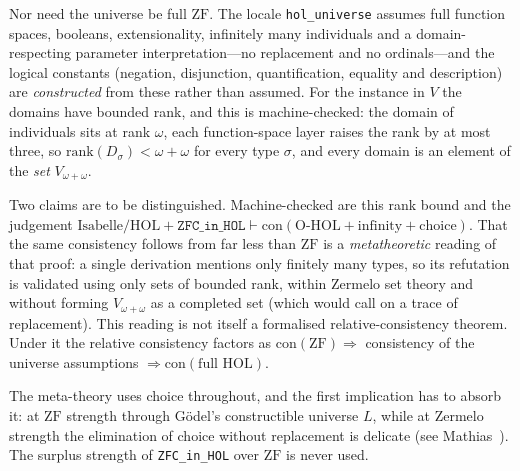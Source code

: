 \documentclass[11pt,a4paper]{article}
\begin{document}
Nor need the universe be full $\mathrm{ZF}$.  The locale
\texttt{hol\_universe} assumes full function spaces, booleans,
extensionality, infinitely many individuals and a domain-respecting
parameter interpretation---no replacement and no ordinals---and the
logical constants (negation, disjunction, quantification, equality and
description) are \emph{constructed} from these rather than assumed.  For
the instance in $V$ the domains have bounded rank, and this is
machine-checked: the domain of individuals sits at rank $\omega$, each
function-space layer raises the rank by at most three, so
$\mathrm{rank}(D_\sigma) < \omega+\omega$ for every type $\sigma$, and
every domain is an element of the \emph{set} $V_{\omega+\omega}$.

Two claims are to be distinguished.  Machine-checked are this rank bound
and the judgement
$\text{Isabelle/HOL}+\texttt{ZFC\_in\_HOL}\vdash
\mathrm{con}(\text{O-HOL}+\text{infinity}+\text{choice})$.  That the same
consistency follows from far less than $\mathrm{ZF}$ is a
\emph{metatheoretic} reading of that proof: a single derivation mentions
only finitely many types, so its refutation is validated using only sets
of bounded rank, within Zermelo set theory and without forming
$V_{\omega+\omega}$ as a completed set (which would call on a trace of
replacement).  This reading is not itself a formalised
relative-consistency theorem.  Under it the relative consistency factors
as $\mathrm{con}(\mathrm{ZF}) \Rightarrow$ consistency of the universe
assumptions $\Rightarrow \mathrm{con}(\text{full HOL})$.

The meta-theory uses choice throughout, and the first implication has to
absorb it: at $\mathrm{ZF}$ strength through G\"odel's constructible
universe $L$, while at Zermelo strength the elimination of choice without
replacement is delicate (see Mathias~\cite{Mathias01}).  The surplus
strength of \texttt{ZFC\_in\_HOL} over $\mathrm{ZF}$ is never used.




\end{document}

